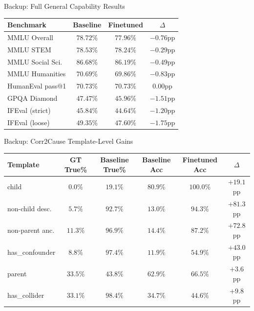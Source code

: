 \documentclass[aspectratio=169,12pt]{beamer}
\begin{document}
\appendix

\begin{frame}{Backup: Full General Capability Results}
  \begin{center}
  \begin{tabular}{lccc}
  \toprule
  Benchmark & Baseline & Finetuned & $\Delta$ \\
  \midrule
  MMLU Overall & $78.72\%$ & $77.96\%$ & $-0.76$pp \\
  MMLU STEM & $78.53\%$ & $78.24\%$ & $-0.29$pp \\
  MMLU Social Sci. & $86.68\%$ & $86.19\%$ & $-0.49$pp \\
  MMLU Humanities & $70.69\%$ & $69.86\%$ & $-0.83$pp \\
  HumanEval pass@1 & $70.73\%$ & $70.73\%$ & $0.00$pp \\
  GPQA Diamond & $47.47\%$ & $45.96\%$ & $-1.51$pp \\
  IFEval (strict) & $45.84\%$ & $44.64\%$ & $-1.20$pp \\
  IFEval (loose) & $49.35\%$ & $47.60\%$ & $-1.75$pp \\
  \bottomrule
  \end{tabular}
  \end{center}
\end{frame}

\begin{frame}{Backup: Corr2Cause Template-Level Gains}
  \begin{center}
  \begin{tabular}{lccccc}
  \toprule
  Template & GT True\% & Baseline True\% & Baseline Acc & Finetuned Acc & $\Delta$ \\
  \midrule
  child & $0.0\%$ & $19.1\%$ & $80.9\%$ & $100.0\%$ & $+19.1$pp \\
  non-child desc. & $5.7\%$ & $92.7\%$ & $13.0\%$ & $94.3\%$ & $+81.3$pp \\
  non-parent anc. & $11.3\%$ & $96.9\%$ & $14.4\%$ & $87.2\%$ & $+72.8$pp \\
  has\_confounder & $8.8\%$ & $97.4\%$ & $11.9\%$ & $54.9\%$ & $+43.0$pp \\
  parent & $33.5\%$ & $43.8\%$ & $62.9\%$ & $66.5\%$ & $+3.6$pp \\
  has\_collider & $33.1\%$ & $98.4\%$ & $34.7\%$ & $44.6\%$ & $+9.8$pp \\
  \bottomrule
  \end{tabular}
  \end{center}
\end{frame}
\end{document}
